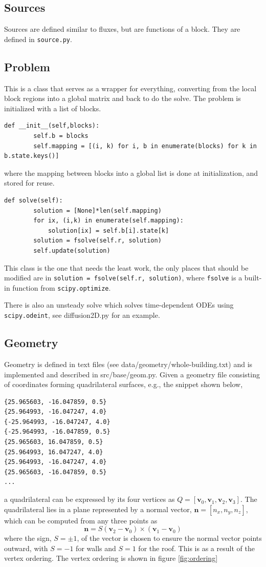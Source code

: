 \documentclass[11pt]{article}
\begin{document}
\subsection{Sources}
Sources are defined similar to fluxes, but are functions of a block. They are defined in \lstinline{source.py}.
\subsection{Problem}
This is a class that serves as a wrapper for everything, converting from the local block regions into a global matrix and back to do the solve. The problem is initialized with a list of blocks.
\begin{lstlisting}
def __init__(self,blocks):
		self.b = blocks
		self.mapping = [(i, k) for i, b in enumerate(blocks) for k in b.state.keys()]
\end{lstlisting}
where the mapping between blocks into a global list is done at initialization, and stored for reuse. 
\begin{lstlisting}
def solve(self):
		solution = [None]*len(self.mapping)
		for ix, (i,k) in enumerate(self.mapping):
			solution[ix] = self.b[i].state[k]
		solution = fsolve(self.r, solution)
		self.update(solution)
\end{lstlisting}
This class is the one that needs the least work, the only places that should be modified are in \lstinline{solution = fsolve(self.r, solution)}, where \lstinline{fsolve} is a built-in function from \lstinline{scipy.optimize}.

There is also an unsteady solve which solves time-dependent ODEs using \lstinline{scipy.odeint}, see diffusion2D.py for an example.

\subsection{Geometry}

Geometry is defined in text files (see data/geometry/whole-building.txt) and is implemented and described in src/base/geom.py. Given a geometry file consisting of coordinates forming quadrilateral surfaces, e.g., the snippet shown below,
\begin{verbatim}
{25.965603, -16.047859, 0.5}
{25.964993, -16.047247, 4.0}
{-25.964993, -16.047247, 4.0}
{-25.964993, -16.047859, 0.5}
{25.965603, 16.047859, 0.5}
{25.964993, 16.047247, 4.0}
{25.964993, -16.047247, 4.0}
{25.965603, -16.047859, 0.5}
...
\end{verbatim}
a quadrilateral can be expressed by its four vertices as $Q = [\mathbf{v}_0,\mathbf{v}_1,\mathbf{v}_2,\mathbf{v}_3]$. The quadrilateral lies in a plane represented by a normal vector, $\mathbf{n} = [n_x,n_y,n_z]$, which can be computed from any three points as 
\[
\mathbf{n} = S(\mathbf{v}_2-\mathbf{v}_0)\times (\mathbf{v}_1-\mathbf{v}_0)
\]
where the sign, $S = \pm 1$, of the vector is chosen to ensure the normal vector points outward, with $S = -1$ for walls and $S = 1$ for the roof. This is as a result of the vertex ordering. The vertex ordering is shown in figure \ref{fig:ordering}
\end{document}
